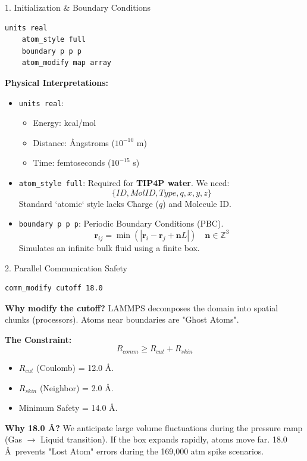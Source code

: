 \documentclass[aspectratio=169, 10pt]{beamer}
\begin{document}
\begin{frame}[fragile]{1. Initialization \& Boundary Conditions}
    \begin{lstlisting}[language=bash]
    units real
    atom_style full
    boundary p p p
    atom_modify map array
    \end{lstlisting}

    \textbf{Physical Interpretations:}
    \begin{itemize}
        \item \texttt{units real}:
        \begin{itemize}
            \item Energy: kcal/mol
            \item Distance: \AA ngstroms ($10^{-10}$ m)
            \item Time: femtoseconds ($10^{-15}$ s)
        \end{itemize}
        \item \texttt{atom\_style full}: Required for \textbf{TIP4P water}. We need:
        \[ \{ID, MolID, Type, q, x, y, z\} \]
        Standard `atomic` style lacks Charge ($q$) and Molecule ID.
        \item \texttt{boundary p p p}: Periodic Boundary Conditions (PBC).
        \begin{equation}
            \mathbf{r}_{ij} = \min(|\mathbf{r}_i - \mathbf{r}_j + \mathbf{n}L|) \quad \mathbf{n} \in \mathbb{Z}^3
        \end{equation}
        Simulates an infinite bulk fluid using a finite box.
    \end{itemize}
\end{frame}

\begin{frame}[fragile]{2. Parallel Communication Safety}
    \begin{lstlisting}[language=bash]
    comm_modify cutoff 18.0
    \end{lstlisting}

    \textbf{Why modify the cutoff?}
    LAMMPS decomposes the domain into spatial chunks (processors). Atoms near boundaries are "Ghost Atoms".
    
    \textbf{The Constraint:}
    \begin{equation}
        R_{comm} \ge R_{cut} + R_{skin}
    \end{equation}
    \begin{itemize}
        \item $R_{cut}$ (Coulomb) = 12.0 \AA.
        \item $R_{skin}$ (Neighbor) = 2.0 \AA.
        \item Minimum Safety = 14.0 \AA.
    \end{itemize}
    \textbf{Why 18.0 \AA?} We anticipate large volume fluctuations during the pressure ramp (Gas $\to$ Liquid transition). If the box expands rapidly, atoms move far. 18.0 \AA\ prevents "Lost Atom" errors during the 169,000 atm spike scenarios.
\end{frame}
\end{document}
